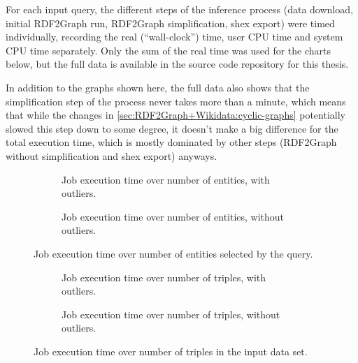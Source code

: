 For each input query,
the different steps of the inference process
(data download, initial RDF2Graph run, RDF2Graph simplification, \gls{shex} export)
were timed individually,
recording the real (“wall-clock”) time, user CPU time and system CPU time separately.
Only the sum of the real time was used for the charts below,
but the full data is available in the source code repository for this thesis.

In addition to the graphs shown here,
the full data also shows that the simplification step of the process
never takes more than a minute,
which means that while the changes in \cref{sec:RDF2Graph+Wikidata:cyclic-graphs} potentially slowed this step down to some degree,
it doesn’t make a big difference for the total execution time,
which is mostly dominated by other steps
(RDF2Graph without simplification and \gls{shex} export)
anyways.

\begin{figure}[ht]
  \begin{subfigure}{\textwidth}
    \centering
    
    \caption{Job execution time over number of entities, with outliers.}
    \label{fig:jobs-over-entities-with-outliers}
  \end{subfigure}
  \begin{subfigure}{\textwidth}
    \centering
    
    \caption{Job execution time over number of entities, without outliers.}
    \label{fig:jobs-over-entities-without-outliers}
  \end{subfigure}
  \caption{Job execution time over number of entities selected by the query.}
  \label{fig:jobs-over-entities}
\end{figure}

\begin{figure}[ht]
  \begin{subfigure}{\textwidth}
    \centering
    
    \caption{Job execution time over number of triples, with outliers.}
    \label{fig:jobs-over-triples-with-outliers}
  \end{subfigure}
  \begin{subfigure}{\textwidth}
    \centering
    
    \caption{Job execution time over number of triples, without outliers.}
    \label{fig:jobs-over-triples-without-outliers}
  \end{subfigure}
  \caption{Job execution time over number of triples in the input data set.}
  \label{fig:jobs-over-triples}
\end{figure}

